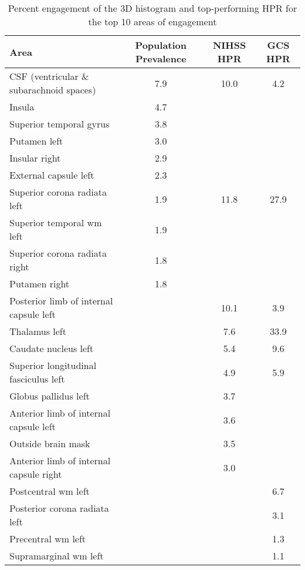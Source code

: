 \begin{table}[ht]
\centering
\begin{tabular}{lccc}
  \hline
Area & Population Prevalence & NIHSS HPR & GCS HPR \\ 
  \hline
CSF (ventricular \& subarachnoid spaces) & 7.9 & 10.0 & 4.2 \\ 
  Insula & 4.7 &  &  \\ 
  Superior temporal gyrus & 3.8 &  &  \\ 
  Putamen left & 3.0 &  &  \\ 
  Insular right & 2.9 &  &  \\ 
  External capsule left & 2.3 &  &  \\ 
  Superior corona radiata left & 1.9 & 11.8 & 27.9 \\ 
  Superior temporal wm left & 1.9 &  &  \\ 
  Superior corona radiata right & 1.8 &  &  \\ 
  Putamen right & 1.8 &  &  \\ 
  Posterior limb of internal capsule left &  & 10.1 & 3.9 \\ 
  Thalamus left &  & 7.6 & 33.9 \\ 
  Caudate nucleus left &  & 5.4 & 9.6 \\ 
  Superior longitudinal fasciculus left &  & 4.9 & 5.9 \\ 
  Globus pallidus left &  & 3.7 &  \\ 
  Anterior limb of internal capsule left &  & 3.6 &  \\ 
  Outside brain mask &  & 3.5 &  \\ 
  Anterior limb of internal capsule right &  & 3.0 &  \\ 
  Postcentral wm left &  &  & 6.7 \\ 
  Posterior corona radiata left &  &  & 3.1 \\ 
  Precentral wm left &  &  & 1.3 \\ 
  Supramarginal wm left &  &  & 1.1 \\ 
   \hline
\end{tabular}
\caption{Percent engagement of the 3D histogram and top-performing HPR for the top 10 areas of engagement} 
\label{t:breakdown}
\end{table}
